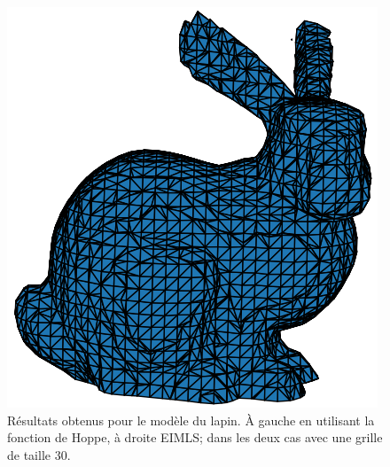 \documentclass[french]{article}
\begin{document}
\begin{figure}[h]
\begin{minipage}{0.47\linewidth}
		\includegraphics[width=\linewidth]{bunnyeimls30.png}
	\end{minipage}
	\caption{Résultats obtenus pour le modèle du lapin. À gauche en utilisant la fonction de Hoppe, à droite EIMLS; dans les deux cas avec une grille de taille 30.}
	\label{fig:eimls}
\end{figure}
\end{document}
